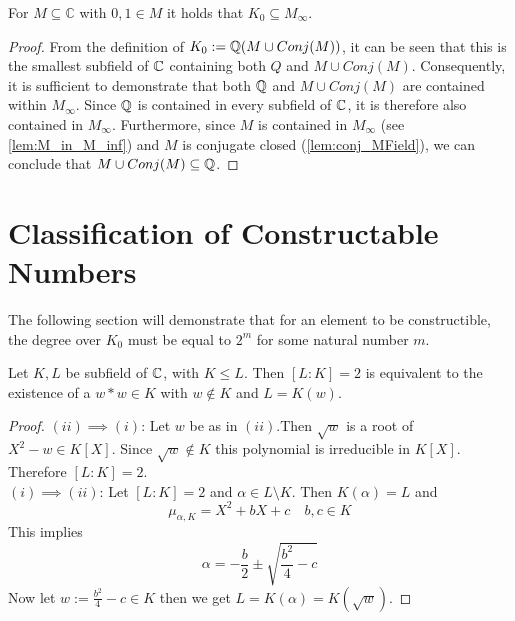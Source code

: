 \begin{lemma}
    \label{lem:K_zero_in_MField}
    \leanok
    For $M\subseteq \mathbb{C}$ with $0,1 \in M$ it holds that $K_0 \subseteq M_{\infty}$.
\end{lemma}
\begin{proof}
From the definition of $K_0 := \mathbb{Q}(M\cup Conj(M))$, 
it can be seen that this is the smallest subfield of $\mathbb{C}$ containing both $Q$ and $M\cup Conj(M)$. 
Consequently, it is sufficient to demonstrate that both $\mathbb{Q}$ and $M\cup Conj(M)$ are contained within $M_{\infty}$. 
Since $\mathbb{Q}$ is contained in every subfield of $\mathbb{C}$, it is therefore also contained in $M_{\infty}$. 
Furthermore, since $M$ is contained in $M_{\infty}$ (see \ref{lem:M_in_M_inf}) and $M$ is conjugate closed (\ref{lem:conj_MField}), we can conclude that $M\cup Conj(M) \subseteq \mathbb{Q}$.
\end{proof}

\section{Classification of Constructable Numbers}
The following section will demonstrate that for an element to be constructible, the degree over $K_0$ must be equal to $2^m$ for some natural number $m$.

\begin{lemma}
    \label{lem:dergree_two_eq_sqr}
    \leanok
    Let $K, L$ be subfield of $\mathbb{C}$, with $K\le L$. Then $[L:K] = 2$ is equivalent to the existence of a $w*w \in K$ with $w \notin K$ and $L = K(w)$.
\end{lemma}
\begin{proof}
    $(ii)\implies (i)$: Let $w$ be as in $(ii)$.Then $\sqrt{w}$ is a root of $X^2 - w \in K[X]$. Since $\sqrt{w} \notin K$ this polynomial is irreducible in $K[X]$. Therefore $[L:K] = 2$.\\
    $(i)\implies (ii)$: Let $[L:K] = 2$ and $\alpha \in L \setminus K$. Then $K(\alpha) = L$ and 
    $$\mu_{\alpha, K}=X^2 + bX + c \quad b,c \in K$$
    This implies 
    $$\alpha = -\frac{b}{2} \pm \sqrt{\frac{b^2}{4} - c} $$
    Now let $w := \frac{b^2}{4} - c \in K$ then we get $L = K(\alpha) = K(\sqrt{w})$.
\end{proof}


